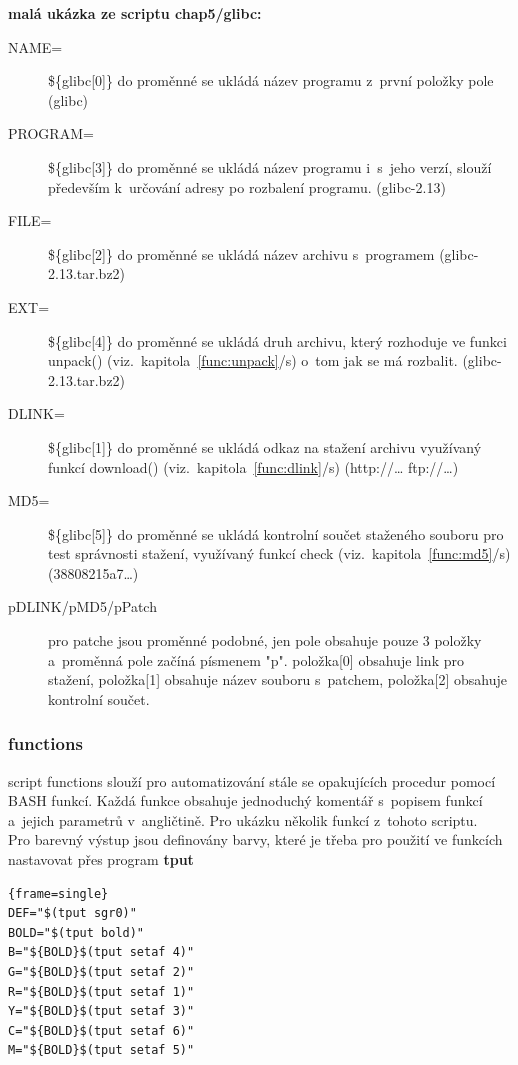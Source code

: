 \documentclass[a4paper,12pt]{article}
\newcommand{\odkazNaKapitolu}[1]{(viz.~kapitola~\ref{#1}/s\pageref{#1})}
\renewcommand{\b}[1]{\textbf{#1}} %
\newenvironment{codeframe}{%
  \begin{Sbox} 
    \begin{minipage} 
      {\columnwidth-\leftmargin-\rightmargin-2\fboxsep-2\fboxrule-4pt} 
}{%

  \end{minipage} 
  \end{Sbox} 
  \begin{center} 
    \fcolorbox{black}{codeback}{\TheSbox} 
  \end{center} 
}
\begin{document}
\b{malá ukázka ze scriptu chap5/glibc:}
\begin{description}
 \item[NAME=]\$\{glibc[0]\} do proměnné se ukládá název programu z~první položky pole (glibc)
 \item[PROGRAM=]\$\{glibc[3]\} do proměnné se ukládá název programu i~s~jeho verzí, slouží především k~určování adresy po rozbalení programu. (glibc-2.13)
 \item[FILE=]\$\{glibc[2]\} do proměnné se ukládá název archivu s~programem (glibc-2.13.tar.bz2)
 \item[EXT=]\$\{glibc[4]\} do proměnné se ukládá druh archivu, který rozhoduje ve funkci unpack() \odkazNaKapitolu{func:unpack} o~tom jak se má rozbalit. (glibc-2.13.tar.bz2)
 \item[DLINK=]\$\{glibc[1]\} do proměnné se ukládá odkaz na stažení archivu využívaný funkcí download() \odkazNaKapitolu{func:dlink} (http://… ftp://…)
 \item[MD5=]\$\{glibc[5]\} do proměnné se ukládá kontrolní součet staženého souboru pro test správnosti stažení, využívaný funkcí check \odkazNaKapitolu{func:md5} (38808215a7…)
 \item[pDLINK/pMD5/pPatch] pro patche jsou proměnné podobné, jen pole obsahuje pouze 3 položky a~proměnná pole začíná písmenem "p". položka[0] obsahuje link pro stažení, položka[1] obsahuje název souboru s~patchem, položka[2] obsahuje kontrolní součet.
 \end{description}

\subsubsection{functions}
script functions slouží pro automatizování stále se opakujících procedur pomocí BASH funkcí. Každá funkce obsahuje jednoduchý komentář s~popisem funkcí a~jejich parametrů v~angličtině. Pro ukázku několik funkcí z~tohoto scriptu.\\

Pro barevný výstup jsou definovány barvy, které je třeba pro použití ve funkcích nastavovat přes program \b{tput}
    \begin{codeframe} 
\begin{Verbatim}{frame=single} 
DEF="$(tput sgr0)"
BOLD="$(tput bold)"
B="${BOLD}$(tput setaf 4)"
G="${BOLD}$(tput setaf 2)"
R="${BOLD}$(tput setaf 1)"
Y="${BOLD}$(tput setaf 3)"
C="${BOLD}$(tput setaf 6)"
M="${BOLD}$(tput setaf 5)"
\end{Verbatim} 
    \end{codeframe}
\end{document}
